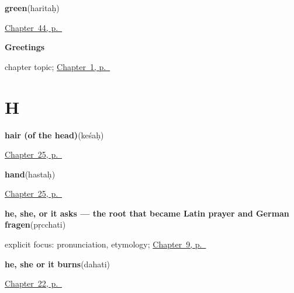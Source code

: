 \noindent\begin{minipage}[t]{\linewidth}
\raggedright
\textbf{green}\enspace\emph{}\enspace(haritaḥ)\par
\footnotesize \hyperref[ch:sa-colours]{Chapter~44, p.~\pageref*{ch:sa-colours}}
\end{minipage}\par\smallskip

\noindent\begin{minipage}[t]{\linewidth}
\raggedright
\textbf{Greetings}\par
\footnotesize chapter topic; \hyperref[ch:greetings]{Chapter~1, p.~\pageref*{ch:greetings}}
\end{minipage}\par\smallskip

\section*{H}

\noindent\begin{minipage}[t]{\linewidth}
\raggedright
\textbf{hair (of the head)}\enspace\emph{}\enspace(keśaḥ)\par
\footnotesize \hyperref[ch:sa-body-more]{Chapter~25, p.~\pageref*{ch:sa-body-more}}
\end{minipage}\par\smallskip

\noindent\begin{minipage}[t]{\linewidth}
\raggedright
\textbf{hand}\enspace\emph{}\enspace(hastaḥ)\par
\footnotesize \hyperref[ch:sa-body-more]{Chapter~25, p.~\pageref*{ch:sa-body-more}}
\end{minipage}\par\smallskip

\noindent\begin{minipage}[t]{\linewidth}
\raggedright
\textbf{he, she, or it asks — the root that became Latin prayer and German fragen}\enspace\emph{}\enspace(pṛcchati)\par
\footnotesize explicit focus: pronunciation, etymology; \hyperref[ch:sa-doing-verbs]{Chapter~9, p.~\pageref*{ch:sa-doing-verbs}}
\end{minipage}\par\smallskip

\noindent\begin{minipage}[t]{\linewidth}
\raggedright
\textbf{he, she or it burns}\enspace\emph{}\enspace(dahati)\par
\footnotesize \hyperref[ch:sa-verbs-of-mind]{Chapter~22, p.~\pageref*{ch:sa-verbs-of-mind}}
\end{minipage}\par\smallskip

